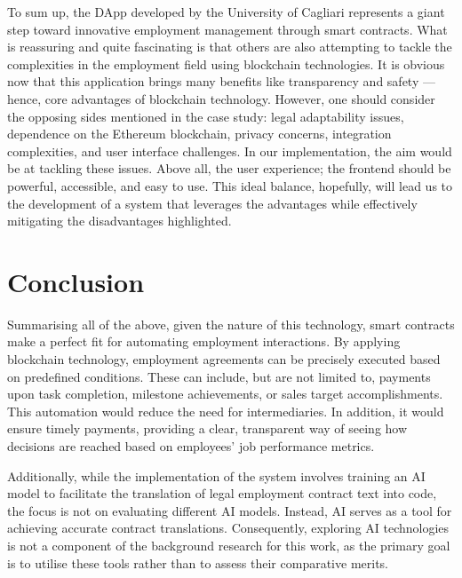 To sum up, the DApp developed by the University of Cagliari represents a giant step toward innovative employment management through smart contracts. What is reassuring and quite fascinating is that others are also attempting to tackle the complexities in the employment field using blockchain technologies. It is obvious now that this application brings many benefits like transparency and safety — hence, core advantages of blockchain technology. However, one should consider the opposing sides mentioned in the case study: legal adaptability issues, dependence on the Ethereum blockchain, privacy concerns, integration complexities, and user interface challenges. In our implementation, the aim would be at tackling these issues. Above all, the user experience; the frontend should be powerful, accessible, and easy to use. This ideal balance, hopefully, will lead us to the development of a system that leverages the advantages while effectively mitigating the disadvantages highlighted.

\section{Conclusion}

Summarising all of the above, given the nature of this technology, smart contracts make a perfect fit for automating employment interactions. By applying blockchain technology, employment agreements can be precisely executed based on predefined conditions. These can include, but are not limited to, payments upon task completion, milestone achievements, or sales target accomplishments. This automation would reduce the need for intermediaries. In addition, it would ensure timely payments, providing a clear, transparent way of seeing how decisions are reached based on employees' job performance metrics.

Additionally, while the implementation of the system involves training an AI model to facilitate the translation of legal employment contract text into code, the focus is not on evaluating different AI models. Instead, AI serves as a tool for achieving accurate contract translations. Consequently, exploring AI technologies is not a component of the background research for this work, as the primary goal is to utilise these tools rather than to assess their comparative merits.
